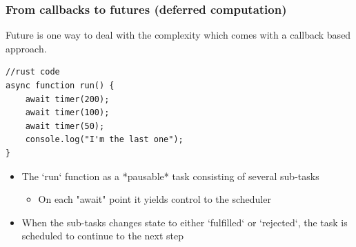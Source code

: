 \begin{frame}[fragile]
    \frametitle{From callbacks to futures (deferred computation)}
% 
% 
Future is one way to deal with the complexity which comes with a callback based approach.
\begin{block}{}
\begin{verbatim}
//rust code
async function run() {
    await timer(200);
    await timer(100);
    await timer(50);
    console.log("I'm the last one");
}
\end{verbatim}
\end{block}
% 
% 
    \begin{itemize}
        \item The `run` function as a *pausable* task consisting of several sub-tasks
    	\begin{itemize}
    	    \item On each "await" point it yields control to the scheduler
    	\end{itemize}
        \item When the sub-tasks changes state to either `fulfilled` or `rejected`, the task is scheduled to continue to the next step
    \end{itemize}

\end{frame}

